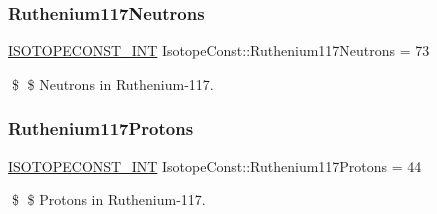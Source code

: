 \subsubsection{\texorpdfstring{Ruthenium117\+Neutrons}{Ruthenium117Neutrons}}
{\footnotesize\ttfamily \mbox{\hyperlink{group___isotope_const-_macros_ga5f18360b3e99483a35c32d789e62621c}{I\+S\+O\+T\+O\+P\+E\+C\+O\+N\+S\+T\+\_\+\+I\+NT}} Isotope\+Const\+::\+Ruthenium117\+Neutrons = 73}

\$ \$ Neutrons in Ruthenium-\/117. \mbox{\label{group___isotope_const-_ruthenium-_ru117_ga1d8cb203252cd2c24c16d75d36902445}} 
\subsubsection{\texorpdfstring{Ruthenium117\+Protons}{Ruthenium117Protons}}
{\footnotesize\ttfamily \mbox{\hyperlink{group___isotope_const-_macros_ga5f18360b3e99483a35c32d789e62621c}{I\+S\+O\+T\+O\+P\+E\+C\+O\+N\+S\+T\+\_\+\+I\+NT}} Isotope\+Const\+::\+Ruthenium117\+Protons = 44}

\$ \$ Protons in Ruthenium-\/117. 